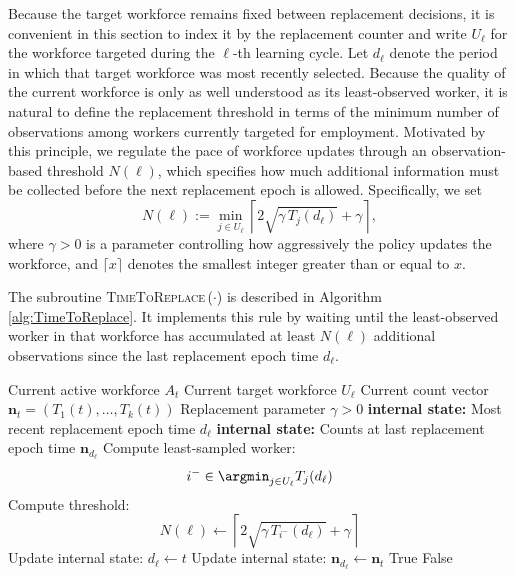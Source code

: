 \documentclass[opre,blindrev]{informs3}
\newcommand{\TimeToReplace}{\textsc{TimeToReplace}\,}
\begin{document}
Because the target workforce remains fixed between replacement decisions, it is convenient in this section to index it by the replacement counter and write \(U_\ell\) for the workforce targeted during the \(\ell\)-th learning cycle. Let \(d_\ell\) denote the period in which that target workforce was most recently selected. Because the quality of the current workforce is only as well understood as its least-observed worker, it is natural to define the replacement threshold in terms of the minimum number of observations among workers currently targeted for employment. Motivated by this principle, we regulate the pace of workforce updates through an observation-based threshold \(N(\ell)\), which specifies how much additional information must be collected before the next replacement epoch is allowed. Specifically, we set
\begin{equation}\label{eq:block-threshold}
    N(\ell)
    :=
    \min_{j \in U_\ell}
    \left\lceil 2\sqrt{\gamma\, T_j(d_\ell)} + \gamma \right\rceil,
\end{equation}
where \(\gamma > 0\) is a parameter controlling how aggressively the policy updates the workforce, and \(\lceil x \rceil\) denotes the smallest integer greater than or equal to \(x\).

The subroutine \TimeToReplace(\(\cdot\)) is described in Algorithm \ref{alg:TimeToReplace}. It implements this rule by waiting until the least-observed worker in that workforce has accumulated at least \(N(\ell)\) additional observations since the last replacement epoch time \(d_\ell\).

\begin{algorithm}
    \caption{TimeToReplace}
    \label{alg:TimeToReplace}
    \begin{algorithmic}[1]
        \Require Current active workforce \(A_t\)
        \Require Current target workforce \(U_{\ell}\)
        \Require Current count vector \(\mathbf{n}_t=(T_1(t),\dots,T_k(t))\)
        \Require Replacement parameter \(\gamma>0\)
        \State \textbf{internal state:} Most recent replacement epoch time \(d_\ell\)
        \State \textbf{internal state:} Counts at last replacement epoch time \(\mathbf{n}_{d_{\ell}}\)
        \State Compute least-sampled worker:
        \[
            i^- \in \argmin_{j \in U_\ell} T_j(d_\ell)
        \]
        \State Compute threshold:
        \[
            N(\ell)\gets \left\lceil 2\sqrt{\gamma\, T_{i^-}(d_\ell)} + \gamma \right\rceil
        \]
            \State Update internal state: \(d_{\ell}\gets t\)
            \State Update internal state: \(\mathbf{n}_{d_{\ell}}\gets \mathbf{n}_t\)
            \State \Return True 
        \Else
            \State \Return False 
        \EndIf
    \end{algorithmic}
\end{algorithm}
\end{document}
